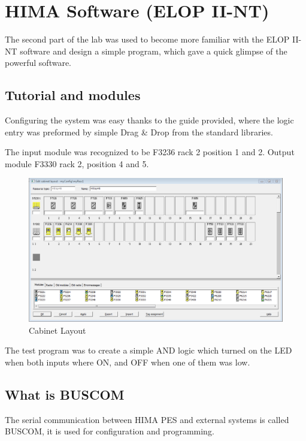 \newpage
\section{HIMA Software (ELOP II-NT)}
The second part of the lab was used to become more familiar with the ELOP II-NT software and design a simple program, which gave a quick glimpse of the powerful software.

\subsection{Tutorial and modules}
Configuring the system was easy thanks to the guide provided, where the logic entry was preformed by simple Drag & Drop from the standard libraries. 

The input module was recognized to be  F3236  rack 2 position 1 and 2.
Output module F3330 rack 2, position 4 and 5.

\begin{figure}[!htb]
    \centering
    \includegraphics[scale=0.55]{images/2b1}
     \caption{Cabinet Layout}
\end{figure}

The test program was to create a simple AND logic which turned on the LED when both inputs where ON, and OFF when one of them was low.



\subsection{What is BUSCOM}
The serial communication between HIMA PES and external systems is called BUSCOM, it is used for configuration and programming.


